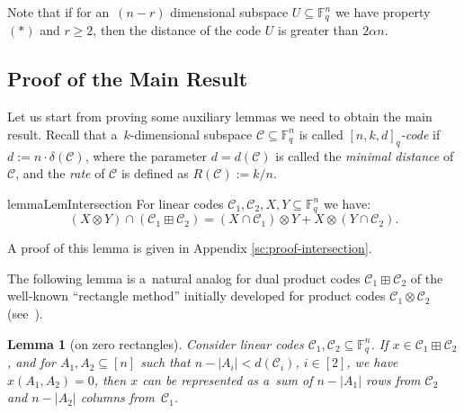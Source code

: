 \documentclass[11pt]{article}
\let\ge\geqslant
\theoremstyle{plain}
\newtheorem{lemma}{Lemma}
\theoremstyle{definition}
\theoremstyle{remark}
\newcommand{\cC}{\mathcal{C}}
\newcommand{\F}{\mathbb{F}}
\begin{document}
Note that if for an~$(n-r)$ dimensional subspace $U\subseteq \F_q^n$ we have property $(*)$ and $r\ge 2$, then the distance of the code $U$ is greater than $2\alpha n$.

\subsection{Proof of the Main Result}

Let us start from proving some auxiliary lemmas we need to obtain the main result. Recall that a~$k$-dimensional subspace $\cC\subseteq \F_q^n$ is called \emph{$[n,k,d]_q$-code} if $d:=n\cdot \delta(\cC)$, where the parameter $d=d(\cC)$ is called the \emph{minimal distance} of $\cC$, and the \emph{rate} of $\cC$ is defined as $R(\cC) := k/n$.


\begin{restatable}{lemma}{LemIntersection}\label{lemma:intersection}
    For linear codes $\cC_1,\cC_2,X,Y\subseteq \F_q^n$ we have: 
    $$(X\otimes Y)\cap (\cC_1\boxplus \cC_2)=(X\cap \cC_1)\otimes Y+X\otimes (Y\cap \cC_2).$$
\end{restatable}
\noindent A proof of this lemma is given in Appendix \ref{sc:proof-intersection}.


The following lemma is a~natural analog for dual product codes $\cC_1 \boxplus \cC_2$ of the well-known ``rectangle method'' initially developed for product codes $\cC_1\otimes \cC_2$ (see~\cite{Dinur:2006, Meir:2012}). 

\begin{lemma}[on zero rectangles]\label{lemma:zeroangle}
    Consider linear codes $\cC_1,\cC_2\subseteq \F_q^n$. If $x\in \cC_1\boxplus \cC_2$, and for $A_1,A_2\subseteq [n]$ such that $n-|A_i|<d(\cC_i)$, $i\in [2]$, we have $x(A_1,A_2)=0$, then $x$ can be represented as a~sum of $n-|A_1|$ rows from $\cC_2$ and $n-|A_2|$ columns from~$\cC_1$.
\end{lemma}
\end{document}
